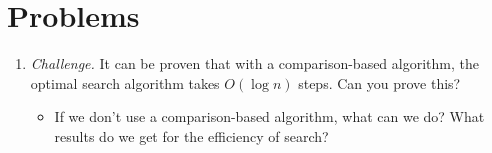 \documentclass{article}
\begin{document}
\section{Problems}

\begin{enumerate}
    \item \textit{Challenge.} It can be proven that with a comparison-based algorithm, the optimal search algorithm takes $O(\log n)$ steps. Can you prove this?
    \begin{itemize}
        \item If we don't use a comparison-based algorithm, what can we do? What results do we get for the efficiency of search?
    \end{itemize}
\end{enumerate}
\end{document}
